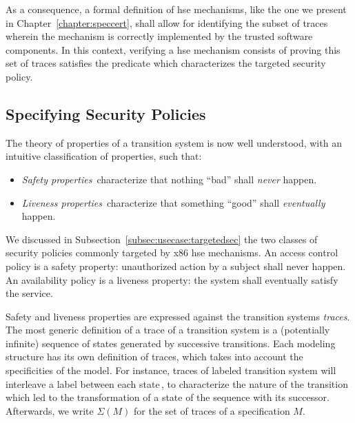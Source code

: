 As a consequence, a formal definition of \ac{hse} mechanisms, like the one we
present in Chapter~\ref{chapter:speccert}, shall allow for identifying the
subset of traces wherein the mechanism is correctly implemented by the trusted
software components.
%
In this context, verifying a \ac{hse} mechanism consists of proving this set of
traces satisfies the predicate which characterizes the targeted security policy.

\subsection{Specifying Security Policies}
\label{subsec:sota:security}

The theory of properties of a transition system is now well understood, with an
intuitive classification of properties, such that:
%
\begin{itemize}
\item \emph{Safety properties}\,\cite{lamport1977proving,lamport1985logical}
  characterize that nothing ``bad'' shall \emph{never} happen.
\item \emph{Liveness properties}\,\cite{lamport1985logical,alpern1985liveness}
  characterize that something ``good'' shall \emph{eventually} happen.
\end{itemize}

We discussed in Subsection~\ref{subsec:usecase:targetedsec} the two classes of
security policies commonly targeted by x86 \ac{hse} mechanisms.
%
An access control policy is a safety property: unauthorized action by a subject
shall never happen.
%
An availability policy is a liveness property: the system shall eventually
satisfy the service.

Safety and liveness properties are expressed against the transition systems
\emph{traces}.
%
The most generic definition of a trace of a transition system is a (potentially
infinite) sequence of states generated by successive transitions.
%
Each modeling structure has its own definition of traces, which takes into
account the specificities of the model. 
%
For instance, traces of labeled transition system will interleave a label
between each state\,\cite{vijayaraghavan2015modular}, to characterize the nature
of the transition which led to the transformation of a state of the sequence
with its successor.
%
%
Afterwards, we write \( \Sigma(M) \) for the set of traces of a specification
\( M \).

